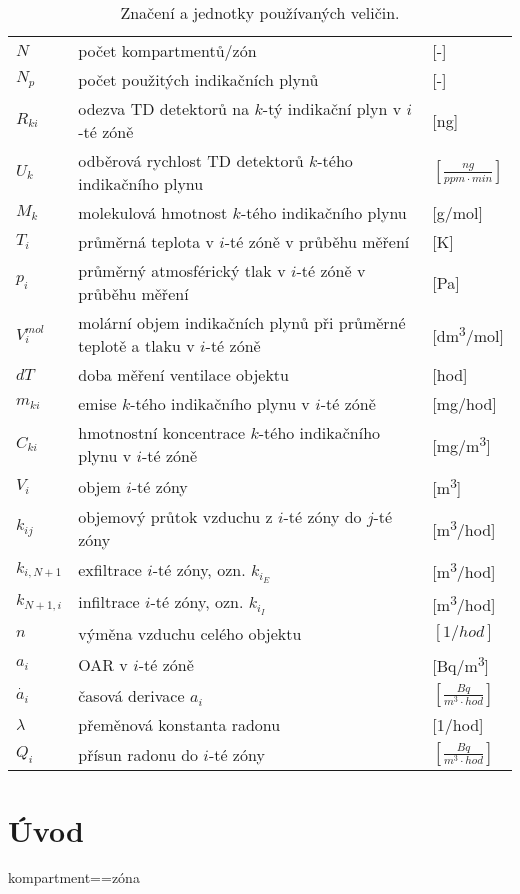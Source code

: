 \begin{table}[p]
\def\arraystretch{1.2}
    \centering
    \caption{Značení a jednotky používaných veličin.}
    \label{tab:veliciny}
    \begin{tabular}{lp{}l}
        \toprule
        $N$   & počet kompartmentů/zón &[-]\\
        $N_p$ & počet použitých indikačních plynů & [-]\\
        $R_{ki}$ & odezva TD detektorů na $k$-tý indikační plyn v $i$-té zóně &[\si{ng}]\\
        $U_k$ & odběrová rychlost TD detektorů $k$-tého indikačního plynu &$\left[\si{\frac{ng}{ppm\cdot min}}\right]$\\
        $M_{k}$ & molekulová hmotnost $k$-tého indikačního plynu &[\si{g/mol}]\\
        $T_i$ & průměrná teplota v $i$-té zóně v průběhu měření& [K]\\
        $p_i$ & průměrný atmosférický tlak v $i$-té zóně v průběhu měření& [Pa]\\
        $V_{i}^{mol}$ & molární objem indikačních plynů při průměrné teplotě a tlaku v $i$-té zóně&[\si{dm^3/mol}]\\ 
        $dT$& doba měření ventilace objektu & [hod]\\
        $m_{ki}$ & emise $k$-tého indikačního plynu v $i$-té zóně & [\si{mg/hod}]\\
        $C_{ki}$ & hmotnostní koncentrace $k$-tého indikačního plynu v $i$-té zóně& [\si{mg/m^3}] \\
        $V_i$ & objem $i$-té zóny& [\si{m^3}] \\
        $k_{ij}$ & objemový průtok vzduchu z $i$-té zóny do $j$-té zóny& [\si{m^3/hod}]\\
        $k_{i, N+1}$ & exfiltrace $i$-té zóny, ozn. $k_{i_E}$&[\si{m^3/hod}]\\
        $k_{N+1, i}$ & infiltrace $i$-té zóny, ozn. $k_{i_I}$&[\si{m^3/hod}]\\
        $n$   & výměna vzduchu celého objektu & $[\si{1/hod}]$\\
        $a_i$ & OAR v $i$-té zóně& [\si{Bq/m^3}] \\
        $\dot{a_i}$ & časová derivace $a_i$ & $\left[\si{\frac{Bq}{m^3\cdot hod}}\right]$ \\
        $\lambda$ & přeměnová konstanta radonu& [\si{1/hod}]\\
        $Q_i$ & přísun radonu do $i$-té zóny& $\left[\si{\frac{Bq}{m^3\cdot hod}}\right]$ \\
        \bottomrule
    \end{tabular}
\end{table}
\chapter{Úvod}
kompartment==zóna
